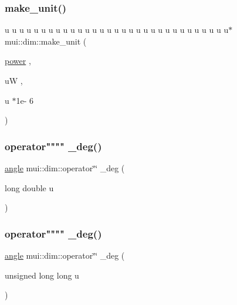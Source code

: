 \mbox{\label{namespacemui_1_1dim_af69c0e5bad5fb33a07c5e0ebe6ca3a6b}} 
\subsubsection{\texorpdfstring{make\+\_\+unit()}{make\_unit()}\hspace{0.1cm}{\footnotesize\ttfamily [32/32]}}
{\footnotesize\ttfamily u u u u u u u u u u u u u u u u u u u u u u u u u u u u u u u$\ast$ mui\+::dim\+::make\+\_\+unit (\begin{DoxyParamCaption}\item[{\hyperlink{namespacemui_1_1dim_a055b2b3b59399dc93eeb974aef05b85b}{power}}]{,  }\item[{uW}]{,  }\item[{u $\ast$1e-\/}]{6 }\end{DoxyParamCaption})}

\mbox{\label{namespacemui_1_1dim_af5daf34b437f46b2ef72c84d1033d9cc}} 
\subsubsection{\texorpdfstring{operator"""" \+\_\+deg()}{operator"" \_deg()}\hspace{0.1cm}{\footnotesize\ttfamily [1/2]}}
{\footnotesize\ttfamily \hyperlink{namespacemui_1_1dim_a967db7ab1d1127cdb94fe084e592d1e0}{angle} mui\+::dim\+::operator\char`\"{}\char`\"{} \+\_\+deg (\begin{DoxyParamCaption}\item[{long double}]{u }\end{DoxyParamCaption})\hspace{0.3cm}{\ttfamily [inline]}}

\mbox{\label{namespacemui_1_1dim_ab22fa587aa8b765a1055f93daf2ae9ec}} 
\subsubsection{\texorpdfstring{operator"""" \+\_\+deg()}{operator"" \_deg()}\hspace{0.1cm}{\footnotesize\ttfamily [2/2]}}
{\footnotesize\ttfamily \hyperlink{namespacemui_1_1dim_a967db7ab1d1127cdb94fe084e592d1e0}{angle} mui\+::dim\+::operator\char`\"{}\char`\"{} \+\_\+deg (\begin{DoxyParamCaption}\item[{unsigned long long}]{u }\end{DoxyParamCaption})\hspace{0.3cm}{\ttfamily [inline]}}

